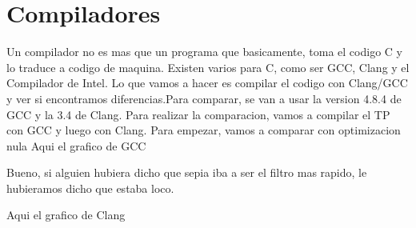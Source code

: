 \section{Compiladores}
Un compilador no es mas que un programa que basicamente, toma el codigo C 
y lo traduce a codigo de maquina. Existen varios para C, como ser GCC, Clang y el Compilador de Intel. Lo que vamos a hacer es compilar el codigo con Clang/GCC y ver si encontramos diferencias.Para comparar, se van a usar la version 4.8.4 de GCC y la 3.4 de Clang. 
Para realizar la comparacion, vamos a compilar el TP con GCC y luego con Clang.
Para empezar, vamos a comparar con optimizacion nula
Aqui el grafico de GCC

\begin{figure}[H]
    \centering
    \begin{floatrow}
    \end{floatrow}
\end{figure}



Bueno, si alguien hubiera dicho que sepia iba a ser el filtro mas rapido, le
hubieramos dicho que estaba loco.

Aqui el grafico de Clang

